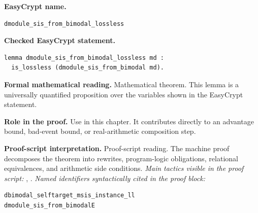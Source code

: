 \begin{formaltheorem}
\noindent\textbf{EasyCrypt name.}
\begin{lstlisting}[language=EasyCrypt,basicstyle=\ttfamily\scriptsize]
dmodule_sis_from_bimodal_lossless
\end{lstlisting}
\noindent\textbf{Checked EasyCrypt statement.}
\begin{lstlisting}[language=EasyCrypt,basicstyle=\ttfamily\scriptsize]
lemma dmodule_sis_from_bimodal_lossless md :
  is_lossless (dmodule_sis_from_bimodal md).
\end{lstlisting}
\noindent\textbf{Formal mathematical reading.}
Mathematical theorem. This lemma is a universally quantified proposition over the variables shown in the EasyCrypt statement.

\noindent\textbf{Role in the proof.}
Use in this chapter. It contributes directly to an advantage bound, bad-event bound, or real-arithmetic composition step.

\noindent\textbf{Proof-script interpretation.}
Proof-script reading. The machine proof decomposes the theorem into rewrites, program-logic obligations, relational equivalences, and arithmetic side conditions.
\emph{Main tactics visible in the proof script:} , .
\emph{Named identifiers syntactically cited in the proof block:}
\begin{lstlisting}[language=EasyCrypt,basicstyle=\ttfamily\scriptsize]
dbimodal_selftarget_msis_instance_ll
dmodule_sis_from_bimodalE
\end{lstlisting}

\end{formaltheorem}

